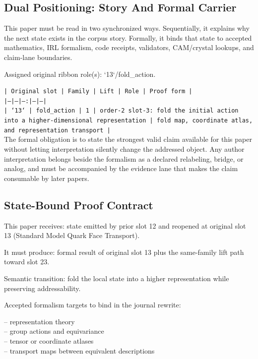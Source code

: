 \documentclass[11pt]{article}
\begin{document}
\subsection*{Dual Positioning: Story And Formal Carrier}

This paper must be read in two synchronized ways. Sequentially, it explains why
the next state exists in the corpus story. Formally, it binds that state to
accepted mathematics, IRL formalism, code receipts, validators, CAM/crystal
lookups, and claim-lane boundaries.

Assigned original ribbon role(s): `13`/fold\_action.

\noindent\texttt{| Original slot | Family | Lift | Role | Proof form |}\\
\noindent\texttt{|---|---|---:|---|---|}\\
\noindent\texttt{| `13` | fold\_action | 1 | order-2 slot-3: fold the initial action into a higher-dimensional representation | fold map, coordinate atlas, and representation transport |}\\

The formal obligation is to state the strongest valid claim available for this
paper without letting interpretation silently change the addressed object. Any
author interpretation belongs beside the formalism as a declared relabeling,
bridge, or analog, and must be accompanied by the evidence lane that makes the
claim consumable by later papers.

\subsection*{State-Bound Proof Contract}

This paper receives: state emitted by prior slot 12 and reopened at original slot 13 (Standard Model Quark Face Transport).

It must produce: formal result of original slot 13 plus the same-family lift path toward slot 23.

Semantic transition: fold the local state into a higher representation while preserving addressability.

Accepted formalism targets to bind in the journal rewrite:

\noindent{}-- representation theory\\
\noindent{}-- group actions and equivariance\\
\noindent{}-- tensor or coordinate atlases\\
\noindent{}-- transport maps between equivalent descriptions\\
\end{document}
